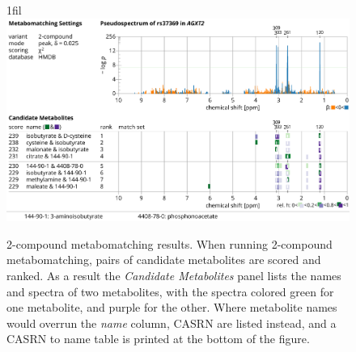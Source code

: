 \documentclass[a4paper,11pt]{article}
\makeatletter
\newcommand*{\centerfloat}{%
  \parindent \z@
  \leftskip \z@ \@plus 1fil \@minus \textwidth
  \rightskip\leftskip
  \parfillskip \z@skip}
\makeatother
\begin{document}
\begin{figure}
\centerfloat
\includegraphics[width=18cm]{f2.pdf}
\caption{2-compound metabomatching results. When running 2-compound metabomatching, pairs of candidate metabolites are scored and ranked. As a result the \emph{Candidate Metabolites} panel lists the names and spectra of two metabolites, with the spectra colored green for one metabolite, and purple for the other. Where metabolite names would overrun the \emph{name} column, CASRN are listed instead, and a CASRN to name table is printed at the bottom of the figure. \label{fig:2}}
\end{figure}
\end{document}
